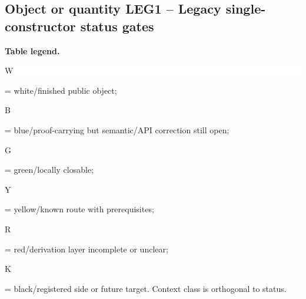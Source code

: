 \subsection*{Object or quantity LEG1 -- Legacy single-constructor status gates}
\hypertarget{objproof:LEG1}{}
\par\smallskip\noindent\begin{minipage}{0.99\linewidth}\footnotesize\raggedright\textbf{Table legend.} \colorbox{white}{\strut W} = white/finished public object; \colorbox{cyan!20}{\strut B} = blue/proof-carrying but semantic/API correction still open; \colorbox{green!18}{\strut G} = green/locally closable; \colorbox{yellow!25}{\strut Y} = yellow/known route with prerequisites; \colorbox{red!20}{\strut R} = red/derivation layer incomplete or unclear; \colorbox{black!18}{\strut K} = black/registered side or future target. Context class is orthogonal to status.\end{minipage}\par\vspace{0.25em}

